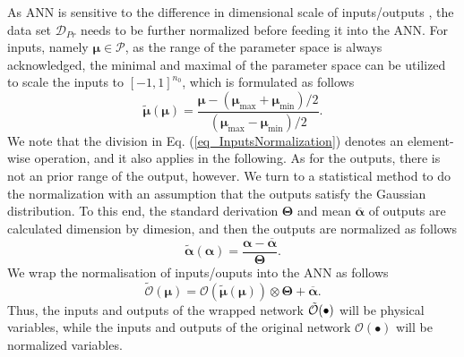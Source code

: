 \documentclass[preprint, 10pt]{elsarticle}
\begin{document}
As ANN is sensitive to the difference in dimensional scale of inputs/outputs \cite{ioffe2015batch},
the data set $\mathcal{D}_{Pr}$ needs to be further normalized before feeding it into the ANN. For inputs, namely $\pmb{\mu} \in \mathcal{P}$, as the range of the parameter space is always acknowledged, the minimal and maximal of the parameter space can be utilized to scale the inputs to $[-1,1]^{n_0}$, which is formulated as follows
\begin{equation}
\tilde{\pmb{\mu}}(\pmb{\mu}) =
\frac
{{\pmb{\mu}}- ( {\pmb{\mu}}_{\max} +{\pmb{\mu}}_{\min} )/2}
{             ( {\pmb{\mu}}_{\max} -{\pmb{\mu}}_{\min} )/2}
.
\label{eq_InputsNormalization}
\end{equation}
We note that the division in Eq. (\ref{eq_InputsNormalization}) denotes an element-wise operation, and it also applies in the following.
As for the outputs, there is not an prior range of the output, however. We turn to a statistical method to do the normalization with an assumption that the outputs satisfy the Gaussian distribution. To this end, the standard derivation $\pmb{\Theta}$ and mean $\overline {\pmb{\alpha}}$ of outputs are calculated dimension by dimesion, and then the outputs are normalized as follows
\begin{equation}
\tilde{\pmb{\alpha}}(\pmb{\alpha}) =
\frac
{{\pmb{\alpha}}- \overline {\pmb{\alpha}}}
{     \pmb{\Theta}         }
.
\end{equation}
We wrap the normalisation of inputs/ouputs into the ANN as follows
\begin{equation}
\tilde{\mathcal{O}}\left(\pmb{\mu}\right)
 =
{\mathcal{O}}\left(\mathbf{ \tilde{\pmb{\mu}}(\pmb{\mu}) }\right)
\otimes
\pmb{\Theta} + \overline {\pmb{\alpha}}
.
\end{equation}
Thus, the inputs and outputs of the wrapped network  $\tilde{\cal{O}}(\bullet)$ will be physical variables, while the inputs and outputs of the original network $\mathcal{O}(\bullet)$  will be normalized variables.
\end{document}
